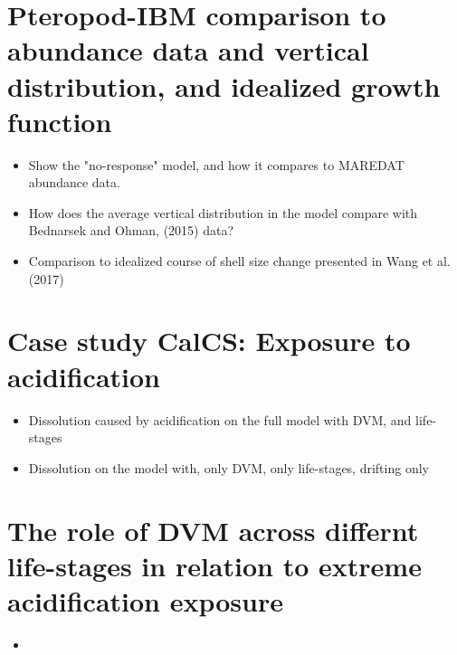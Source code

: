 
\section{Pteropod-IBM comparison to abundance data and vertical distribution, and idealized growth function}
\begin{itemize}
    \item Show the "no-response" model, and how it compares to MAREDAT abundance data.
    \item How does the average vertical distribution in the model compare  with Bednarsek and Ohman, (2015) data?
    \item Comparison to idealized course of shell size change presented in Wang et al. (2017)
\end{itemize}
\section{Case study CalCS: Exposure to acidification}
\begin{itemize}
    \item Dissolution caused by acidification on the full model with DVM, and life-stages
    \item Dissolution on the model with, only DVM, only life-stages, drifting only
\end{itemize}{}



\section{The role of DVM across differnt life-stages in relation to extreme acidification exposure}
\begin{itemize}
    \item 
\end{itemize}







